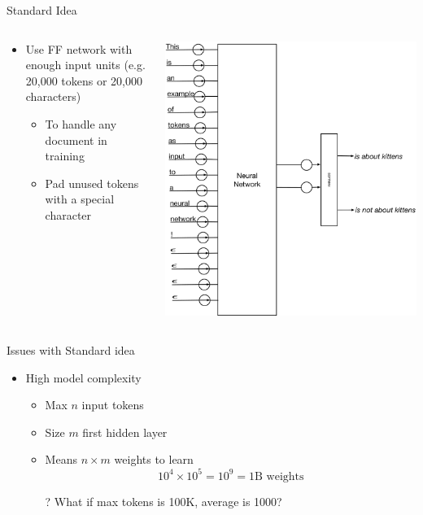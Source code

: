 \documentclass[aspectratio=169]{beamer}
\begin{document}
\begin{frame}{Standard Idea}

\begin{columns}
\begin{column}{0.5\textwidth}
\begin{itemize}
	\item Use FF network with enough input units (e.g. 20,000 tokens or 20,000 characters)
	\begin{itemize}
	\item To handle any document in training
	\item Pad unused tokens with a special character
	\end{itemize}
\end{itemize}
\end{column}
\begin{column}{0.5\textwidth}
\includegraphics[width=1\textwidth]{lectRNN/tokens.pdf}
\end{column}
\end{columns}
\end{frame}
\begin{frame}{Issues with Standard idea}

\begin{itemize}
	\item High model complexity
	\begin{itemize}
	\item Max $n$ input tokens
	\item Size $m$ first hidden layer
	\item Means $n \times m$ weights to learn
	$$10^4 \times 10^5 = 10^9 = 1\text{B weights}$$
	\item[?] What if max tokens is 100K, average is 1000?
	\end{itemize}
\end{itemize}
\end{frame}
\end{document}
